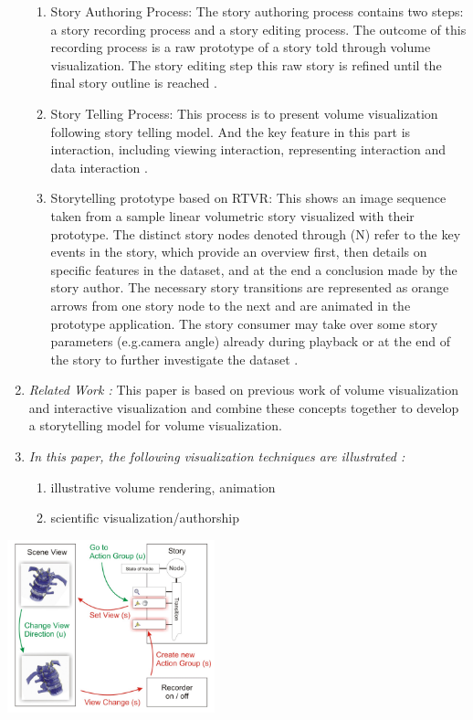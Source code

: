\documentclass{egpubl}
\begin{document}
\begin{enumerate}
\begin{enumerate}
\item Story Authoring Process: The story authoring process contains two steps: a story recording process and a story editing process. The outcome of this recording process is a raw prototype of a story told through volume visualization. The story editing step this raw story is refined until the final story outline is reached \cite{wohlfat}.
\item Story Telling Process: This process is to present volume visualization following story telling model. And the key feature in this part is interaction, including viewing interaction, representing interaction and data interaction \cite{wohlfat}.
\item Storytelling prototype based on RTVR: This shows an image sequence taken from a sample linear volumetric story visualized with their prototype. The distinct story nodes denoted through (N) refer to the key events in the story, which provide an overview first, then details on specific features in the dataset, and at the end a conclusion made by the story author. The necessary story transitions are represented as orange arrows from one story node to the next and are animated in the prototype application. The story consumer may take over some story parameters (e.g.camera angle) already during playback or at the end of the story to further investigate the dataset \cite{wohlfat}.
\end{enumerate}
\item \textit{Related Work :}  This paper is based on previous work of volume visualization \cite{Amy,robert,Ivan} and interactive visualization \cite{merlin}and combine these concepts together to develop a storytelling model for volume visualization.
\item \textit{In this paper, the following visualization techniques are illustrated :} 
\begin{enumerate}
\item illustrative volume rendering, animation
\item scientific visualization/authorship
\end{enumerate}
\end{enumerate}
\begingroup
\centering
\includegraphics[width=6cm]{./images/VRVis-Wohlfart-Michael}
\label{fig:VRVis-Wohlfart-Michael}
\endgroup
\end{document}
